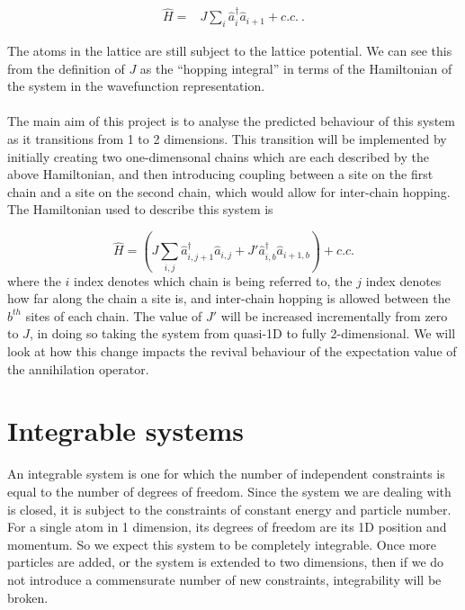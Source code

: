 \documentclass[a4paper,10pt]{article}
\begin{document}
\begin{equation}
\begin{align*}
\hat{H}=&J\sum_{i}\hat{a}^\dagger_{i}\hat{a}_{i+1}+c.c.\ .
\end{align*}
\end{equation}

The atoms in the lattice are still subject to the lattice potential. We can see this from the definition of $J$ as the ``hopping integral'' in terms of the Hamiltonian of
the system in the wavefunction representation.
\\\\
 The main aim of this project is to analyse the predicted behaviour of this system as it transitions from 1 to 2 dimensions. This transition will be implemented by initially 
 creating two one-dimensonal chains which are each described by the above Hamiltonian, and then introducing coupling between a site on the first chain and a site on the second
 chain, which would allow for inter-chain hopping. The Hamiltonian used to describe this system is
 
\begin{equation}
\hat{H}=(J\sum_{i,j}\hat{a}^\dagger_{i,j+1}\hat{a}_{i,j} + J'\hat{a}^\dagger_{i,b}\hat{a}_{i+1,b})+c.c.
\end{equation}
where the $i$ index denotes which chain is being referred to, the $j$ index denotes how far along the chain a site is, and inter-chain hopping is allowed between the $b^{th}$  sites of each chain. The value of $J'$ will be increased incrementally from zero to $J$, in doing so taking the system from quasi-1D to 
fully 2-dimensional. We will look at how this change impacts the revival behaviour of the expectation value of the annihilation operator.


\section{Integrable systems}
An integrable system is one for which the number of independent constraints is equal to the number of degrees of freedom. Since the system we are dealing with
is closed, it is subject to the constraints of constant energy and particle number. For a single atom in 1 dimension, its degrees of freedom are its 1D position and momentum.
So we expect this system to be completely integrable. Once more particles are added, or the system is extended to two dimensions, then if we do not introduce a commensurate number
of new constraints, integrability will be broken.
\end{document}
